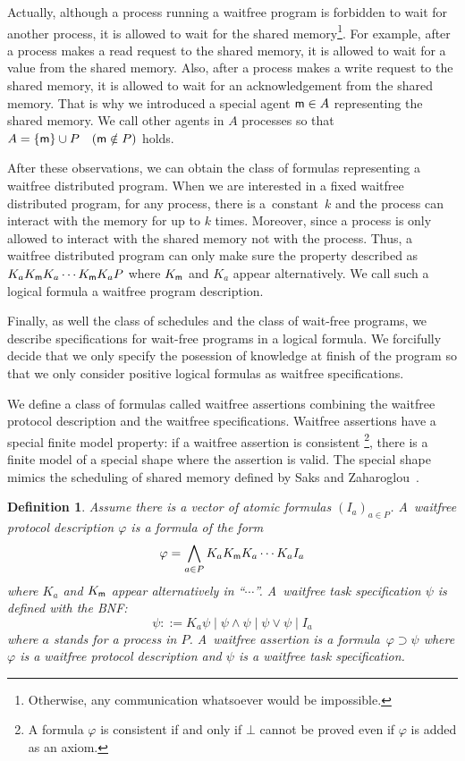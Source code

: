 \documentclass[doctor]{iscs-thesis}
\newcommand{\memory}{{\sf m}}
\newtheorem{definition}{Definition}
\begin{document}
Actually, although a process running a waitfree program is forbidden to wait for another process,
it is allowed to wait for the shared memory\footnote{Otherwise, any communication
whatsoever would be impossible.}.
For example, after a process
 makes a read request to the shared memory,
 it is allowed to wait for a value from the shared memory.
 Also, after a process makes a write request to the shared memory,
 it is allowed to wait for an acknowledgement from the shared memory.
 That is why we introduced a special agent $\memory\in A$ representing the shared memory.
 We call other agents in $A$ processes so that
 $A=\{\memory\}\cup P\quad (\memory\notin P)$ holds.

 After these observations, we can obtain the class of
 formulas representing a waitfree distributed program.
 When we are interested in a fixed waitfree distributed program,
 for any process, there is a~constant~$k$ and the process can interact with the memory for
 up to $k$ times.
 Moreover, since a process is only allowed to interact with the shared memory not with the
 process.
 Thus, a waitfree distributed program can only make sure the property described as 
 $K_aK_\memory K_a\cdots K_\memory K_a P$ where $K_\memory$ and $K_a$ appear
 alternatively.
 We call such a logical formula a waitfree program description.

 Finally, as well the class of schedules and the class of wait-free programs,
 we describe specifications for wait-free programs in a logical formula.
 We forcifully decide that we only specify the posession of knowledge at finish of the
 program so that we only consider positive logical formulas as waitfree specifications.

We define a class of formulas called waitfree assertions combining the waitfree protocol
description and the waitfree specifications.
Waitfree assertions have a special finite model property:
if a waitfree assertion is consistent%
\footnote{A formula $\varphi$ is consistent if and only if $\bot$ cannot be proved even if
$\varphi$ is added as an axiom.}, there is a finite model of a special shape
where the assertion is valid.
The special shape mimics the scheduling of shared memory
defined by Saks and Zaharoglou~\cite{saks2000wait}.

\begin{definition}
 Assume there is a vector of atomic formulas $(I_a)_{a\in P}$.
 A~\textit{waitfree protocol description} $\varphi$ is a formula of the form
\[
 \varphi = \bigwedge_{a\in P} K_a K_\memory K_a \cdots K_a I_a
\]
where $K_a$ and $K_\memory$ appear alternatively in ``$\cdots$''.
 A~\textit{waitfree task specification} $\psi$ is defined with the BNF:
\[
 \psi ::= K_a\psi\mid \psi\wedge\psi\mid \psi\vee\psi\mid I_a
\]
where $a$ stands for a process in $P$.
 A~\textit{waitfree assertion} is a formula~$\varphi\supset\psi$ where $\varphi$ is a
 waitfree protocol description and $\psi$ is a waitfree task specification.
\end{definition}
\end{document}
